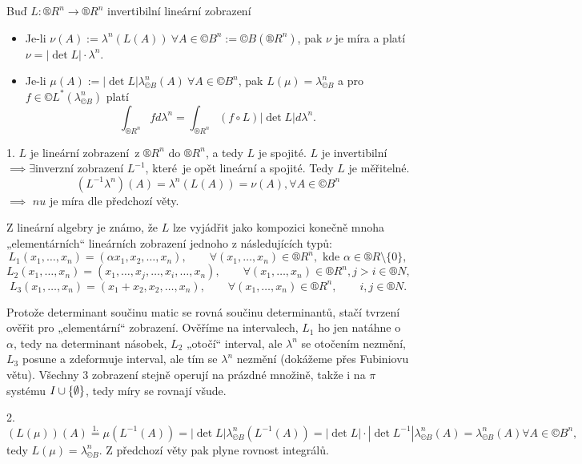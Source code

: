 \documentclass[12pt]{article}					%
\begin{document}
\begin{veta}
	Buď $L: ®R^n \rightarrow ®R^n$ invertibilní lineární zobrazení

	\begin{itemize}
		\item Je-li $\nu(A) := \lambda^n(L(A))\ \forall A \in ©B^n := ©B(®R^n)$, pak $\nu$ je míra a platí $\nu = |\det L|·\lambda^n$.
		\item Je-li $\mu(A) := |\det L|\lambda_{©B}^n(A)\ \forall A \in ©B^n$, pak $L(\mu) = \lambda_{©B}^n$ a pro $f \in ©L^*(\lambda_{©B}^n)$ platí
			$$ \int_{®R^n} f d\lambda^n = \int_{®R^n} (f \circ L) |\det L| d\lambda^n. $$
	\end{itemize}

	\begin{dukazin}
		1. $L$ je lineární zobrazení z $®R^n$ do $®R^n$, a tedy $L$ je spojité. $L$ je invertibilní $\implies \exists$inverzní zobrazení $L^{-1}$, které je opět lineární a spojité. Tedy $L$ je měřitelné.
		$$ (L^{-1}\lambda^n)(A) = \lambda^n(L(A)) = \nu(A), \forall A \in ©B^n $$
		$\implies$ $nu$ je míra dle předchozí věty.

		Z lineární algebry je známo, že $L$ lze vyjádřit jako kompozici konečně mnoha „elementárních“ lineárních zobrazení jednoho z následujících typů:
		$$ L_1(x_1, …, x_n) = (\alpha x_1, x_2, …, x_n), \qquad \forall (x_1, …, x_n) \in ®R^n, \text{ kde }\alpha \in ®R\setminus\{0\}, $$
		$$ L_2(x_1, …, x_n) = (x_1, …, x_j, …, x_i, …, x_n), \qquad \forall (x_1, …, x_n) \in ®R^n, j > i \in ®N, $$
		$$ L_3(x_1, …, x_n) = (x_1 + x_2, x_2, …, x_n), \qquad \forall (x_1, …, x_n) \in ®R^n, \qquad i, j \in ®N. $$

		Protože determinant součinu matic se rovná součinu determinantů, stačí tvrzení ověřit pro „elementární“ zobrazení. Ověříme na intervalech, $L_1$ ho jen natáhne o $\alpha$, tedy na determinant násobek, $L_2$ „otočí“ interval, ale $\lambda^n$ se otočením nezmění, $L_3$ posune a zdeformuje interval, ale tím se $\lambda^n$ nezmění (dokážeme přes Fubiniovu větu). Všechny 3 zobrazení stejně operují na prázdné množině, takže i na $\pi$ systému $I \cup \{\emptyset\}$, tedy míry se rovnají všude.

		2.
		$$ (L(\mu))(A) \overset{1.}{=} \mu(L^{-1}(A)) = |\det L| \lambda_{©B}^n(L^{-1}(A)) = |\det L|·|\det L^{-1}| \lambda_{©B}^n(A) = \lambda_{©B}^n(A) \forall A \in ©B^n, $$
		tedy $L(\mu) = \lambda_{©B}^n$. Z předchozí věty pak plyne rovnost integrálů.
	\end{dukazin}
\end{veta}
\end{document}
